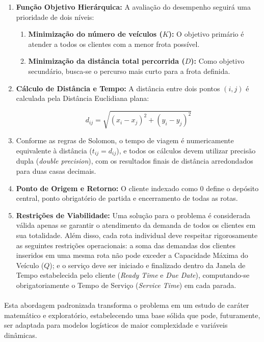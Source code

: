 \begin{enumerate}
    \item \textbf{Função Objetivo Hierárquica:} A avaliação do desempenho seguirá uma prioridade de dois níveis:
    \begin{enumerate}
        \item \textbf{Minimização do número de veículos ($K$):} O objetivo primário é atender a todos os clientes com a menor frota possível.
        \item \textbf{Minimização da distância total percorrida ($D$):} Como objetivo secundário, busca-se o percurso mais curto para a frota definida.
    \end{enumerate}

    \item \textbf{Cálculo de Distância e Tempo:} A distância entre dois pontos $(i, j)$ é calculada pela Distância Euclidiana plana:
    
    $$d_{ij} = \sqrt{(x_i - x_j)^2 + (y_i - y_j)^2}$$

    \item Conforme as regras de Solomon, o tempo de viagem é numericamente equivalente à distância ($t_{ij} = d_{ij}$), e todos os cálculos devem utilizar precisão dupla (\textit{double precision}), com os resultados finais de distância arredondados para duas casas decimais.

    \item \textbf{Ponto de Origem e Retorno:} O cliente indexado como 0 define o depósito central, ponto obrigatório de partida e encerramento de todas as rotas.
    
    \item \textbf{Restrições de Viabilidade:} Uma solução para o problema é considerada válida apenas se garantir o atendimento da demanda de todos os clientes em sua totalidade. Além disso, cada rota individual deve respeitar rigorosamente as seguintes restrições operacionais: a soma das demandas dos clientes inseridos em uma mesma rota não pode exceder a Capacidade Máxima do Veículo ($Q$); e o serviço deve ser iniciado e finalizado dentro da Janela de Tempo estabelecida pelo cliente (\textit{Ready Time} e \textit{Due Date}), computando-se obrigatoriamente o Tempo de Serviço (\textit{Service Time}) em cada parada.
\end{enumerate}

\paragraph{}Esta abordagem padronizada transforma o problema em um estudo de caráter matemático e exploratório, estabelecendo uma base sólida que pode, futuramente, ser adaptada para modelos logísticos de maior complexidade e variáveis dinâmicas.

